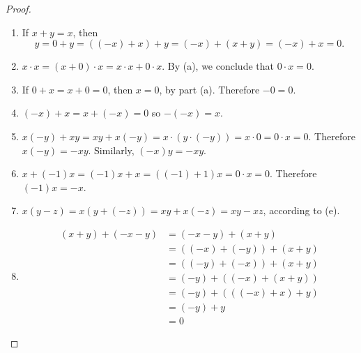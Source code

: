 \begin{proof}
    \begin{enumerate}[label={(\alph*)}]
        \item If $x + y = x$, then
              \[
                  y = 0 + y = ((-x) + x) + y = (-x) + (x + y) = (-x) + x = 0.
              \]
        \item $x\cdot x = (x + 0)\cdot x = x\cdot x + 0\cdot x$. By (a), we conclude that $0\cdot x = 0$.
        \item If $0 + x = x + 0 = 0$, then $x = 0$, by part (a). Therefore $-0 = 0$.
        \item $(-x) + x = x + (-x) = 0$ so $-(-x) = x$.
        \item $x(-y) + xy = xy + x(-y) = x\cdot (y\cdot (-y)) = x\cdot 0 = 0\cdot x = 0$. Therefore $x(-y) = -xy$. Similarly, $(-x)y = -xy$.
        \item $x + (-1)x = (-1)x + x = ((-1) + 1)x = 0\cdot x = 0$. Therefore $(-1)x = -x$.
        \item $x(y - z) = x(y + (-z)) = xy + x(-z) = xy - xz$, according to (e).
        \item \begin{align*}
                  (x + y) + (-x - y) & = (-x - y) + (x + y)      \\
                                     & = ((-x) + (-y)) + (x + y) \\
                                     & = ((-y) + (-x)) + (x + y) \\
                                     & = (-y) + ((-x) + (x + y)) \\
                                     & = (-y) + (((-x) + x) + y) \\
                                     & = (-y) + y                \\
                                     & = 0
              \end{align*}


\end{enumerate}
\end{proof}

